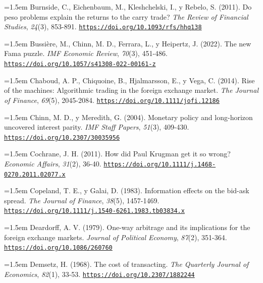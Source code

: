 \documentclass[10pt,a4paper]{article}
\begin{document}
\noindent\hangindent=1.5em Burnside, C., Eichenbaum, M., Kleshchelski, I., y Rebelo, S. (2011). Do peso problems explain the returns to the carry trade? \textit{The Review of Financial Studies}, \textit{24}(3), 853-891. \href{https://doi.org/10.1093/rfs/hhq138}{\nolinkurl{https://doi.org/10.1093/rfs/hhq138}}

\noindent\hangindent=1.5em Bussière, M., Chinn, M. D., Ferrara, L., y Heipertz, J. (2022). The new Fama puzzle. \textit{IMF Economic Review}, \textit{70}(3), 451-486. \href{https://doi.org/10.1057/s41308-022-00161-z}{\nolinkurl{https://doi.org/10.1057/s41308-022-00161-z}}

\noindent\hangindent=1.5em Chaboud, A. P., Chiquoine, B., Hjalmarsson, E., y Vega, C. (2014). Rise of the machines: Algorithmic trading in the foreign exchange market. \textit{The Journal of Finance}, \textit{69}(5), 2045-2084. \href{https://doi.org/10.1111/jofi.12186}{\nolinkurl{https://doi.org/10.1111/jofi.12186}}

\noindent\hangindent=1.5em Chinn, M. D., y Meredith, G. (2004). Monetary policy and long-horizon uncovered interest parity. \textit{IMF Staff Papers}, \textit{51}(3), 409-430. \href{https://doi.org/10.2307/30035956}{\nolinkurl{https://doi.org/10.2307/30035956}}

\noindent\hangindent=1.5em Cochrane, J. H. (2011). How did Paul Krugman get it so wrong? \textit{Economic Affairs}, \textit{31}(2), 36-40. \href{https://doi.org/10.1111/j.1468-0270.2011.02077.x}{\nolinkurl{https://doi.org/10.1111/j.1468-0270.2011.02077.x}}

\noindent\hangindent=1.5em Copeland, T. E., y Galai, D. (1983). Information effects on the bid-ask spread. \textit{The Journal of Finance}, \textit{38}(5), 1457-1469. \href{https://doi.org/10.1111/j.1540-6261.1983.tb03834.x}{\nolinkurl{https://doi.org/10.1111/j.1540-6261.1983.tb03834.x}}

\noindent\hangindent=1.5em Deardorff, A. V. (1979). One-way arbitrage and its implications for the foreign exchange markets. \textit{Journal of Political Economy}, \textit{87}(2), 351-364. \href{https://doi.org/10.1086/260760}{\nolinkurl{https://doi.org/10.1086/260760}}

\noindent\hangindent=1.5em Demsetz, H. (1968). The cost of transacting. \textit{The Quarterly Journal of Economics}, \textit{82}(1), 33-53. \href{https://doi.org/10.2307/1882244}{\nolinkurl{https://doi.org/10.2307/1882244}}
\end{document}
